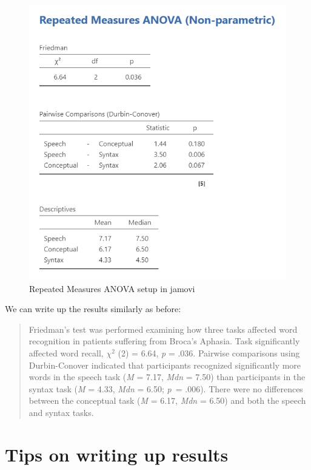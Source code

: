 \documentclass[
]{book}
\begin{document}
\begin{figure}

{\centering \includegraphics[width=1\linewidth]{images/05-repeated-measures-anova/rm-anova_friedman} 

}

\caption{Repeated Measures ANOVA setup in jamovi}\label{fig:unnamed-chunk-10}
\end{figure}

We can write up the results similarly as before:

\begin{quote}
Friedman's test was performed examining how three tasks affected word recognition in patients suffering from Broca's Aphasia. Task significantly affected word recall, \(\chi^2\) (2) = 6.64, \emph{p} = .036. Pairwise comparisons using Durbin-Conover indicated that participants recognized significantly more words in the speech task (\emph{M} = 7.17, \emph{Mdn} = 7.50) than participants in the syntax task (\emph{M} = 4.33, \emph{Mdn} = 6.50; \emph{p}~= .006). There were no differences between the conceptual task (\emph{M} = 6.17, \emph{Mdn} = 6.50) and both the speech and syntax tasks.
\end{quote}

\hypertarget{tips-on-writing-up-results-1}{%
\section{Tips on writing up results}\label{tips-on-writing-up-results-1}}
\end{document}
